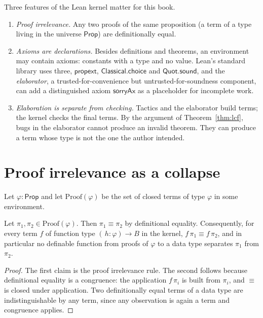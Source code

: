 Three features of the Lean kernel matter for this book.
\begin{enumerate}[label=(\roman*),nosep]
\item \emph{Proof irrelevance.} Any two proofs of the same proposition (a term of a type living in the universe $\mathsf{Prop}$) are definitionally equal.
\item \emph{Axioms are declarations.} Besides definitions and theorems, an environment may contain axioms: constants with a type and no value. Lean's standard library uses three, $\mathsf{propext}$, $\mathsf{Classical.choice}$ and $\mathsf{Quot.sound}$, and the \emph{elaborator}, a trusted-for-convenience but untrusted-for-soundness component, can add a distinguished axiom $\mathsf{sorryAx}$ as a placeholder for incomplete work.
\item \emph{Elaboration is separate from checking.} Tactics and the elaborator build terms; the kernel checks the final terms. By the argument of Theorem~\ref{thm:lcf}, bugs in the elaborator cannot produce an invalid theorem. They can produce a term whose type is not the one the author intended.
\end{enumerate}

\section{Proof irrelevance as a collapse}
\label{sec:irrelevance}

Let $\varphi:\mathsf{Prop}$ and let $\mathrm{Proof}(\varphi)$ be the set of closed terms of type $\varphi$ in some environment.

\begin{proposition}
\label{prop:irrelevance}
Let $\pi_1,\pi_2\in\mathrm{Proof}(\varphi)$. Then $\pi_1\equiv\pi_2$ by definitional equality. Consequently, for every term $f$ of function type $(\,h:\varphi)\to B$ in the kernel, $f\,\pi_1\equiv f\,\pi_2$, and in particular no definable function from proofs of $\varphi$ to a data type separates $\pi_1$ from $\pi_2$.
\end{proposition}

\begin{proof}
The first claim is the proof irrelevance rule. The second follows because definitional equality is a congruence: the application $f\,\pi_i$ is built from $\pi_i$, and $\equiv$ is closed under application. Two definitionally equal terms of a data type are indistinguishable by any term, since any observation is again a term and congruence applies.
\end{proof}

